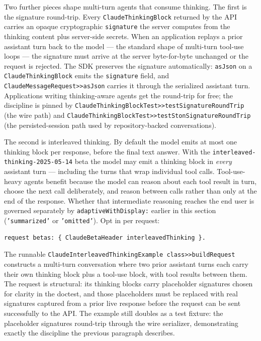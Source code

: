 \documentclass[a4paper,10pt,fleqn]{article}
\begin{document}
Two further pieces shape multi-turn agents that consume thinking.
The first is the signature round-trip.  Every
\texttt{ClaudeThinkingBlock} returned by the API carries an opaque
cryptographic \texttt{signature} the server computes from the
thinking content plus server-side secrets.  When an application
replays a prior assistant turn back to the model --- the standard
shape of multi-turn tool-use loops --- the signature must arrive at
the server byte-for-byte unchanged or the request is rejected.  The
SDK preserves the signature automatically: \texttt{asJson} on a
\texttt{ClaudeThinkingBlock} emits the \texttt{signature} field, and
\texttt{ClaudeMessageRequest>>asJson} carries it through the
serialized assistant turn.  Applications writing thinking-aware
agents get the round-trip for free; the discipline is pinned by
\texttt{ClaudeThinkingBlockTest>>testSignatureRoundTrip} (the wire
path) and
\texttt{ClaudeThinkingBlockTest>>testStonSignatureRoundTrip} (the
persisted-session path used by repository-backed conversations).

The second is interleaved thinking.  By default the model emits at
most one thinking block per response, before the final text answer.
With the \texttt{interleaved-thinking-2025-05-14} beta the model may
emit a thinking block in \emph{every} assistant turn --- including
the turns that wrap individual tool calls.  Tool-use-heavy agents
benefit because the model can reason about each tool result in turn,
choose the next call deliberately, and reason between calls rather
than only at the end of the response.  Whether that intermediate
reasoning reaches the end user is governed separately by
\texttt{adaptiveWithDisplay:} earlier in this section
(\texttt{'summarized'} or \texttt{'omitted'}).
Opt in per request:

\begin{lstlisting}[language={}]
request betas: { ClaudeBetaHeader interleavedThinking }.
\end{lstlisting}

The runnable
\texttt{ClaudeInterleavedThinkingExample class>>buildRequest}
constructs a multi-turn conversation where two prior assistant
turns each carry their own thinking block plus a tool-use block,
with tool results between them.  The request is structural: its
thinking blocks carry placeholder signatures chosen for clarity
in the doctest, and those placeholders must be replaced with real
signatures captured from a prior live response before the request
can be sent successfully to the API.  The example still doubles
as a test fixture: the placeholder signatures round-trip through
the wire serializer, demonstrating exactly the discipline the
previous paragraph describes.
\end{document}
